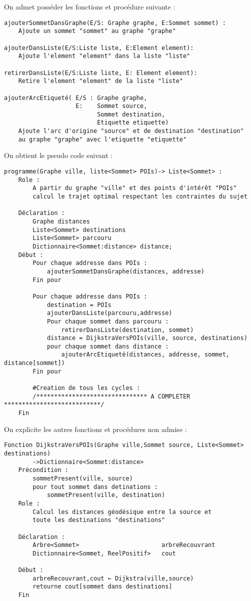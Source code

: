 On admet posséder les fonctions et procédure suivante :
\begin{verbatim}
ajouterSommetDansGraphe(E/S: Graphe graphe, E:Sommet sommet) :
    Ajoute un sommet "sommet" au graphe "graphe"

ajouterDansListe(E/S:Liste liste, E:Element element):
    Ajoute l'element "element" dans la liste "liste" 

retirerDansListe(E/S:Liste liste, E: Element element):
    Retire l'element "element" de la liste "liste"

ajouterArcEtiqueté( E/S : Graphe graphe,
                    E:    Sommet source,
                          Sommet destination,
                          Etiquette etiquette)
    Ajoute l'arc d'origine "source" et de destination "destination"
    au graphe "graphe" avec l'etiquette "etiquette"
\end{verbatim}
On obtient le pseudo code suivant :
\begin{verbatim}    
programme(Graphe ville, liste<Sommet> POIs)-> Liste<Sommet> :
    Role :
        A partir du graphe "ville" et des points d'intérêt "POIs"
        calcul le trajet optimal respectant les contraintes du sujet

    Déclaration :
        Graphe distances
        Liste<Sommet> destinations
        Liste<Sommet> parcouru
        Dictionnaire<Sommet:distance> distance;
    Début :        
        Pour chaque addresse dans POIs :
            ajouterSommetDansGraphe(distances, addresse)
        Fin pour
        
        Pour chaque addresse dans POIs :
            destination = POIs
            ajouterDansListe(parcouru,addresse)
            Pour chaque sommet dans parcouru :
                retirerDansListe(destination, sommet)
            distance = DijkstraVersPOIs(ville, source, destinations)
            pour chaque sommet dans distance :
                ajouterArcEtiqueté(distances, addresse, sommet, distance[sommet])
        Fin pour

        #Creation de tous les cycles :
        /******************************* A COMPLETER ***************************/
    Fin
\end{verbatim}
On explicite les autres fonctions et procédures non admise :
\begin{verbatim}
Fonction DijkstraVersPOIs(Graphe ville,Sommet source, Liste<Sommet> destinations)
        ->Dictionnaire<Sommet:distance>
    Précondition :
        sommetPresent(ville, source)
        pour tout sommet dans detinations :
            sommetPresent(ville, destination)
    Role :
        Calcul les distances géodésique entre la source et 
        toute les destinations "destinations"
    
    Déclaration :
        Arbre<Sommet>                       arbreRecouvrant
        Dictionnaire<Sommet, ReelPositif>   cout
    
    Début :
        arbreRecouvrant,cout ← Dijkstra(ville,source)
        retourne cout[sommet dans destinations]    
    Fin
\end{verbatim}

